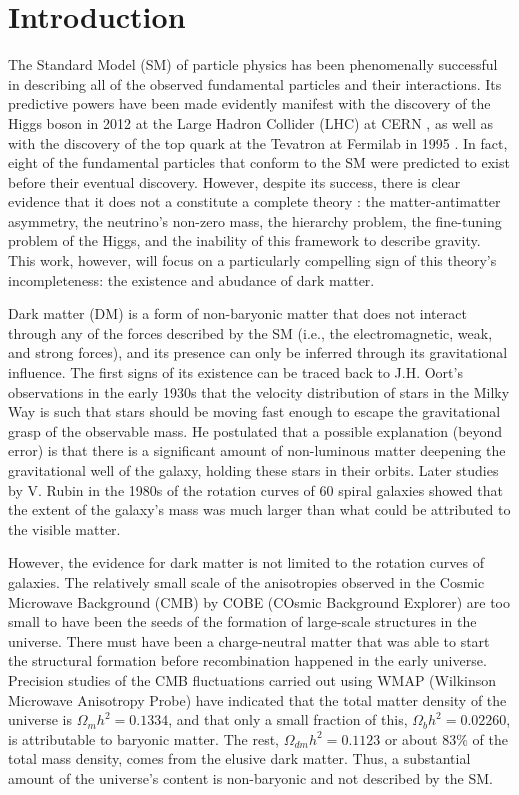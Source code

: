 \chapter{Introduction}

The Standard Model (SM) of particle physics has been phenomenally successful in describing all of the observed fundamental particles and their interactions. Its predictive powers have been made evidently manifest with the discovery of the Higgs boson in 2012 at the Large Hadron Collider (LHC) at CERN \cite{collaborationObservationNewBoson2012}, as well as with the discovery of the top quark at the Tevatron at Fermilab in 1995 \cite{abachiObservationTopQuark1995}. In fact, eight of the fundamental particles that conform to the SM were predicted to exist before their eventual discovery. However, despite its success, there is clear evidence that it does not a constitute a complete theory \cite{saikumarExploringFrontiersChallenges2024,garrettDarkMatterPrimer2011}: the matter-antimatter asymmetry, the neutrino's non-zero mass, the hierarchy problem, the fine-tuning problem of the Higgs, and the inability of this framework to describe gravity. This work, however, will focus on a particularly compelling sign of this theory's incompleteness: the existence and abudance of dark matter.

Dark matter (DM) is a form of non-baryonic matter that does not interact through any of the forces described by the SM (i.e., the electromagnetic, weak, and strong forces), and its presence can only be inferred through its gravitational influence. The first signs of its existence can be traced back to J.H. Oort's observations in the early 1930s that the velocity distribution of stars in the Milky Way is such that stars should be moving fast enough to escape the gravitational grasp of the observable mass. He postulated that a possible explanation (beyond error) is that there is a significant amount of non-luminous matter deepening the gravitational well of the galaxy, holding these stars in their orbits. Later studies by V. Rubin in the 1980s of the rotation curves of 60 spiral galaxies showed that the extent of the galaxy's mass was much larger than what could be attributed to the visible matter.

However, the evidence for dark matter is not limited to the rotation curves of galaxies. The relatively small scale of the anisotropies observed in the Cosmic Microwave Background (CMB) by COBE (COsmic Background Explorer) are too small to have been the seeds of the formation of large-scale structures in the universe. There must have been a charge-neutral matter that was able to start the structural formation before recombination happened in the early universe. Precision studies of the CMB fluctuations carried out using WMAP (Wilkinson Microwave Anisotropy Probe) have indicated that the total matter density of the universe is $\Omega_{m}h^2 = 0.1334$, and that only a small fraction of this, $\Omega_{b}h^2 = 0.02260$, is attributable to baryonic matter. The rest, $\Omega_{dm}h^2 = 0.1123$ or about $83\%$ of the total mass density, comes from the elusive dark matter. Thus, a substantial amount of the universe's content is non-baryonic and not described by the SM.

